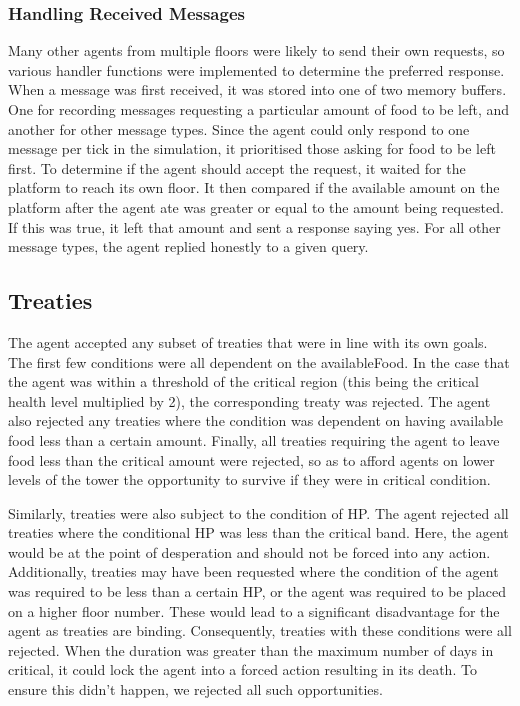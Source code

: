 \subsubsection{Handling Received Messages}
Many other agents from multiple floors were likely to send their own requests, so various handler functions were implemented to determine the preferred response. When a message was first received, it was stored into one of two memory buffers. One for recording messages requesting a particular amount of food to be left, and another for other message types. Since the agent could only respond to one message per tick in the simulation, it prioritised those asking for food to be left first. To determine if the agent should accept the request, it waited for the platform to reach its own floor. It then compared if the available amount on the platform after the agent ate was greater or equal to the amount being requested. If this was true, it left that amount and sent a response saying yes. For all other message types, the agent replied honestly to a given query. 

\subsection{Treaties} \label{team4Treaties}
The agent accepted any subset of treaties that were in line with its own goals. The first few conditions were all dependent on the availableFood. In the case that the agent was within a threshold of the critical region (this being the critical health level multiplied by 2), the corresponding treaty was rejected. The agent also rejected any treaties where the condition was dependent on having available food less than a certain amount. Finally, all treaties requiring the agent to leave food less than the critical amount were rejected, so as to afford agents on lower levels of the tower the opportunity to survive if they were in critical condition. 

Similarly, treaties were also subject to the condition of HP. The agent rejected all treaties where the conditional HP was less than the critical band. Here, the agent would be at the point of desperation and should not be forced into any action. Additionally, treaties may have been requested where the condition of the agent was required to be less than a certain HP, or the agent was required to be placed on a higher floor number. These would lead to a significant disadvantage for the agent as treaties are binding. Consequently, treaties with these conditions were all rejected. When the duration was greater than the maximum number of days in critical, it could lock the agent into a forced action resulting in its death. To ensure this didn't happen, we rejected all such opportunities. 

